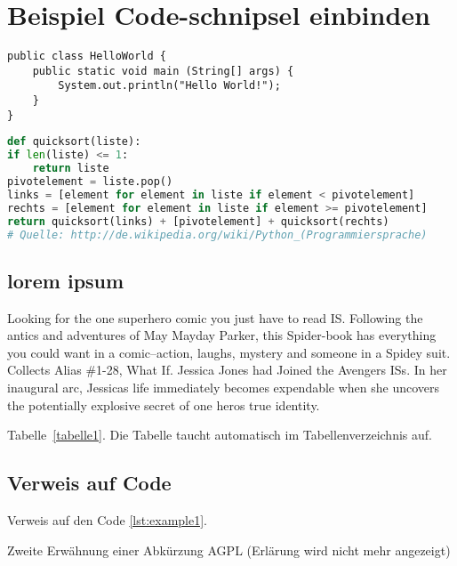 
\chapter{Beispiel Code-schnipsel einbinden}

\begin{lstlisting}[caption=Code-Beispiel, label=lst:example1]
public class HelloWorld {
	public static void main (String[] args) {
		System.out.println("Hello World!");
	}
}
\end{lstlisting}

\begin{lstlisting}[caption=Python-Code, label=lst:python-code, title=Titel des Python-Codes,language=Python]
def quicksort(liste):
if len(liste) <= 1:
	return liste
pivotelement = liste.pop()
links = [element for element in liste if element < pivotelement]
rechts = [element for element in liste if element >= pivotelement]
return quicksort(links) + [pivotelement] + quicksort(rechts)
# Quelle: http://de.wikipedia.org/wiki/Python_(Programmiersprache)
\end{lstlisting}

\section{lorem ipsum}
Looking for the one superhero comic you just have to read \ac{IS}.
Following the antics and adventures of May Mayday Parker, this Spider-book has everything you could want in a comic--action, laughs, mystery and someone in a Spidey suit.
Collects Alias \#1-28, What If. Jessica Jones had Joined the Avengers \acp{IS}.
In her inaugural arc, Jessicas life immediately becomes expendable when she uncovers the potentially explosive secret of one heros true identity.

Tabelle~\ref{tabelle1}.
Die Tabelle taucht automatisch im Tabellenverzeichnis auf.

\begin{table}[ht!]
	\caption{Test der Funktion der Tabelle und ihrer Darstellung}
	\label{tabelle1}
\end{table}

\section{Verweis auf Code}
Verweis auf den Code \autoref{lst:example1}.

Zweite Erwähnung einer Abkürzung \ac{AGPL} (Erlärung wird nicht mehr angezeigt)